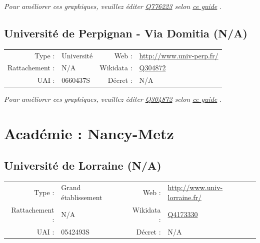 \documentclass[12pt,french,landscape]{article}
\begin{document}
\textit{\scriptsize Pour améliorer ces graphiques, veuillez éditer \href{https://www.wikidata.org/entity/Q776223}{Q776223}  selon \href{https://github.com/cpesr/wikidataESR/blob/master/Rmd/wikidataESR.md}{ce guide}}
.


\newpage

\hypertarget{universituxe9-de-perpignan---via-domitia-na}{%
\subsection{Université de Perpignan - Via Domitia
(N/A)}\label{universituxe9-de-perpignan---via-domitia-na}}

\begin{tabular*}{0.45\textwidth}{rp{2cm}rl}  
\hline  
Type : & Université & Web : &\href{http://www.univ-perp.fr/}{http://www.univ-perp.fr/} \\  
Rattachement : & N/A & Wikidata : & \href{https://www.wikidata.org/entity/Q304872}{Q304872} \\  
UAI : & 0660437S & Décret : & N/A \\  
\hline  
\end{tabular*}

\textit{\scriptsize Pour améliorer ces graphiques, veuillez éditer \href{https://www.wikidata.org/entity/Q304872}{Q304872}  selon \href{https://github.com/cpesr/wikidataESR/blob/master/Rmd/wikidataESR.md}{ce guide}}
.


\newpage

\hypertarget{acaduxe9mie-nancy-metz}{%
\section{Académie : Nancy-Metz}\label{acaduxe9mie-nancy-metz}}

\hypertarget{universituxe9-de-lorraine-na}{%
\subsection{Université de Lorraine
(N/A)}\label{universituxe9-de-lorraine-na}}

\begin{tabular*}{0.45\textwidth}{rp{2cm}rl}  
\hline  
Type : & Grand établissement & Web : &\href{http://www.univ-lorraine.fr/}{http://www.univ-lorraine.fr/} \\  
Rattachement : & N/A & Wikidata : & \href{https://www.wikidata.org/entity/Q4173330}{Q4173330} \\  
UAI : & 0542493S & Décret : & N/A \\  
\hline  
\end{tabular*}
\end{document}
